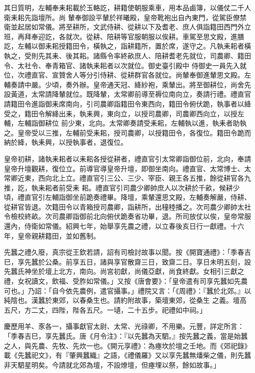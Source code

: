 \begin{pinyinscope}
 其日質明，左輔奉耒耜載於玉輅訖，耕籍使朝服乘車，用本品鹵簿，以儀仗二千人衛耒耜先詣壇所。尚
 輦奉御設平輦於祥曦殿，皇帝靴袍出自內東門，從駕臣僚禁衛並起居如常儀。將至耕所，文武侍耕、從耕以下及耆老、庶人俱詣籍田西門外立班，再拜奉迎訖，各就次。從耕、陪耕等官服朝服以俟耕。車駕至思文殿，進膳訖，左輔以御耒耜授籍田令，橫執之，詣耕籍所，置於席，遂守之。凡執耒耜者橫執之，受則先其耒、後其耜。諸縣令率終畝庶人、陪耕耆老先就位，司農卿、籍田令、太社令、奉青箱官、諸執耒耜者以次就位。御史臺引殿中
 侍御史一員先入就位，次禮直官、宣贊舍人等分引侍耕、從耕群官各就位。尚輦奉御進輦思文殿。左輔奏請中嚴。少頃，奏外辦。皇帝通天冠、絳紗袍，乘輦出。將至御耕位，尚舍先設黃道，太常請降輦就位。既降輦，太常卿前導至褥位南向立，奏請行禮。禮直官請籍田令進詣御耒席南向，引司農卿詣籍田令東西向，籍田令俯伏跪，執事者以絳受之，籍田令解絳出耒，執耒興，東向立，以授司農卿，司農卿西向立，以授左輔，左輔詣御耕位
 前少東，北向。太常卿奏請受耒耜，左輔執以進，執耒者助執之。皇帝受以三推，左輔前受耒耜，授司農卿，以授籍田令，各復位。籍田令跪而納於絳，執耒興，以授執事者，退復位。



 皇帝初耕，諸執耒耜者以耒耜各授從耕者，禮直官引太常卿詣御位前，北向，奉請皇帝升壇觀耕，復位立。前導官導皇帝升壇，即御坐南向。禮直官、太常博士、太常卿近東，西向北上立。禮直官引三公、三少、宰臣、親王各五推，餘從耕官各九推，訖，執耒耜者前受耒
 耜。禮直官引司農少卿帥庶人以次耕於千畝，候耕少頃，禮直官引左輔詣御坐前跪奏禮畢。降壇，乘輦還思文殿，左輔奏解嚴，侍耕、從耕官皆退。次籍田令以青箱授司農卿，詣耕所，出穜稑播之。次司農少卿帥太社令檢校終畝。次司農卿詣御前北向俯伏跪奏省功畢，退。所司放仗以俟，皇帝常服還內，侍衛如常儀。紹興七年，始舉享先農之禮，以立春後亥日行一獻禮。十六年，皇帝親耕籍田，並如舊制。



 先蠶之禮久廢，真宗從王欽若請，詔有司檢討故事以聞。按《開寶通禮》：「季春吉巳，享先蠶於公桑。前享五日，諸與享官散齋三日，致齋二日。享日未明五刻，設先蠶氏神坐於壇上北方，南向。尚宮初獻，尚儀亞獻，尚食終獻。女相引三獻之禮，女祝讀文，飲福、受胙如常儀。」又按《唐會要》：「皇帝遣有司享先蠶如先農可也。」乃詔：「自今依先農例，遣官攝事。」禮院又言：「《周禮》：『蠶於北郊。』以純陰也。漢蠶於東郊，以春桑生也。請約附故事，築壇東郊，從桑生
 之義。壇高五尺，方二丈，四陛，陛各五尺。一壝，二十五步。祀禮如中祠。」



 慶歷用羊、豕各一，攝事獻官太尉、太常、光祿卿，不用樂。元豐，詳定所言：「季春吉巳，享先蠶氏。唐《月令注》：『以先蠶為天駟。』按先蠶之義，當是始蠶之人，與先農、先牧、先炊一也。《開元享禮》：為瘞坎於壇之壬地。而《郊祀錄》載《先蠶祀文》，有『肇興蠶織』之語，《禮儀羅》又以享先蠶無燔柴之儀，則先蠶非天駟星明矣。今請就北郊為壇，不設燎壇，但瘞埋以祭，餘如故事。」




\end{pinyinscope}
